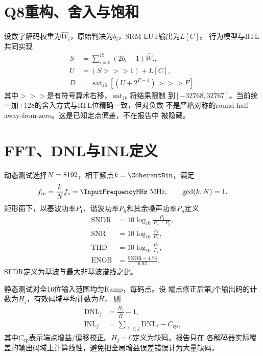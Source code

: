 \documentclass[11pt,a4paper,UTF8,fontset=none,openany]{ctexrep}
\numberwithin{equation}{chapter}
\numberwithin{figure}{chapter}
\numberwithin{table}{chapter}
\begin{document}
\section{Q8重构、舍入与饱和}

设数字解码权重为$\widehat W_i$，原始判决为$b_i$，SRM LUT输出为$L[C]$。
行为模型与RTL共同实现
\begin{align}
  S &= \sum_{i=0}^{19}(2b_i-1)\widehat W_i,
  \label{eq:weighted-sum}\\
  U &= (S\mathbin{\mathrm{>>>}}1)+L[C],
  \label{eq:normalized-sum}\\
  D &= \operatorname{sat}_{16}
  \left[
    \left(U+2^{F-1}\right)\mathbin{\mathrm{>>>}}F
  \right].
  \label{eq:final-decode}
\end{align}
其中$\mathrm{>>>}$是有符号算术右移，$\operatorname{sat}_{16}$将结果限制
到$[-32768,32767]$。当前统一加$+128$的舍入方式与RTL位精确一致，但对负数
不是严格对称的round-half-away-from-zero。这是已知定点偏差，不在报告中
被隐藏。

\section{FFT、DNL与INL定义}

动态测试选择$N=8192$，相干频点$k=\CoherentBin$，满足
\begin{equation}
  f_{\mathrm{in}}=\frac{k}{N}f_s
  =\InputFrequencyMHz\ \mathrm{MHz},
  \qquad \gcd(k,N)=1.
  \label{eq:coherent-frequency}
\end{equation}
矩形窗下，以基波功率$P_1$、谐波功率$P_h$和其余噪声功率$P_n$定义
\begin{align}
  \mathrm{SNDR}&=10\log_{10}\frac{P_1}{P_n+P_h},
  \label{eq:sndr}\\
  \mathrm{SNR}&=10\log_{10}\frac{P_1}{P_n},
  \label{eq:snr}\\
  \mathrm{THD}&=10\log_{10}\frac{P_h}{P_1},
  \label{eq:thd}\\
  \mathrm{ENOB}&=\frac{\mathrm{SNDR}-1.76}{6.02}.
  \label{eq:enob}
\end{align}
SFDR定义为基波与最大非基波谱线之比。

静态测试对全16位输入范围均匀Ramp，每码\StaticSamplesPerCode 点。设
端点修正后第$j$个输出码的计数为$H_j$，有效码域平均计数为$\overline H$，
则
\begin{align}
  \mathrm{DNL}_j &= \frac{H_j}{\overline H}-1,
  \label{eq:dnl}\\
  \mathrm{INL}_j &= \sum_{\ell\le j}\mathrm{DNL}_\ell-C_{\mathrm{ep}},
  \label{eq:inl}
\end{align}
其中$C_{\mathrm{ep}}$表示端点增益/偏移校正。$H_j=0$定义为缺码。报告只在
各解码器实际覆盖的输出码域上计算线性，避免把全局增益误差错误计为大量缺码。
\end{document}
